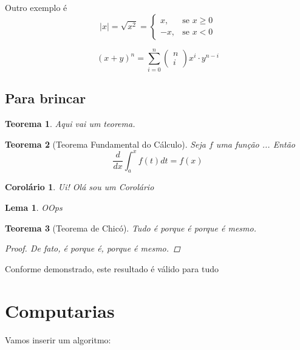 \documentclass[10pt,a4paper,twocolumn]{book}
\newtheorem{teorema}{Teorema}
\newtheorem{corolario}{Corolário}[teorema]
\newtheorem{lema}{Lema}[corolario]
\begin{document}
			Outro exemplo é 
			\begin{equation}
				|x| = \sqrt{x^2} = 
					\begin{cases}
						x, &\text{se } x \ge 0 \\
						-x, &\text{se } x < 0 
					\end{cases}
			\end{equation}
			
			\begin{equation}
				(x+y)^n = \sum_{i=0}^{n} 
					\begin{pmatrix}
						n \\
						i
					\end{pmatrix}
				x^i\cdot y^{n-i}
			\end{equation}
			
	\subsection{Para brincar}
		\begin{teorema}
			Aqui vai um teorema.
		\end{teorema}
	
		\begin{teorema}[Teorema Fundamental do Cálculo]
			Seja $f$ uma função ...
			Então 
			\begin{equation}
			\frac{d}{dx}\int_{a}^{x}f(t)dt = f(x)
			\end{equation}
		\end{teorema}
	
		\begin{corolario}
			Ui! Olá sou um Corolário
		\end{corolario}
			
		\begin{lema}
			OOps
		\end{lema}
		
		\begin{teorema}[Teorema de Chicó] Tudo é porque é porque é mesmo.
			\begin{proof}
				De fato, é porque é, porque é mesmo.
			\end{proof}
		\end{teorema}
	Conforme demonstrado, este resultado é válido para tudo
	
	
	\section{Computarias}
		Vamos inserir um algoritmo:
		
\end{document}
